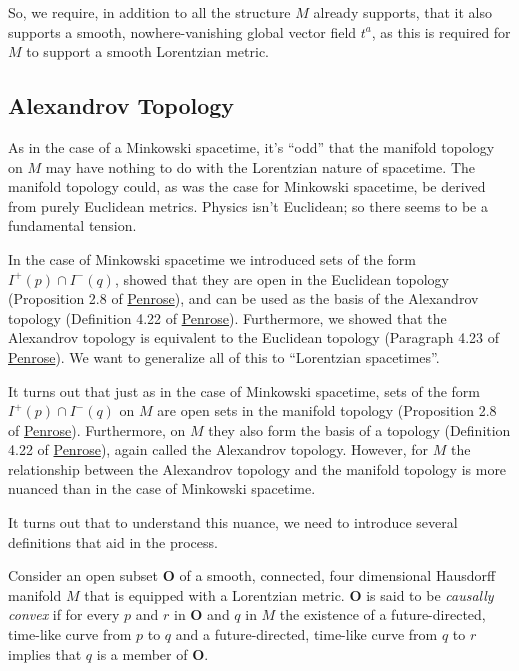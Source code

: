 So, we require, in addition to all the structure $M$ already supports, that it also supports a smooth, nowhere-vanishing global vector field $t^a$, as this is required for $M$ to support a smooth Lorentzian metric.

\subsection{Alexandrov Topology}
As in the case of a Minkowski spacetime, it's ``odd'' that the manifold topology on $M$ may have nothing to do with the Lorentzian nature of spacetime. The manifold topology could, as was the case for Minkowski spacetime, be derived from purely Euclidean metrics. Physics isn't Euclidean; so there seems to be a fundamental tension.

In the case of Minkowski spacetime we introduced sets of the form $I^+(p) \cap I^-(q)$, showed that they are open in the Euclidean topology (Proposition 2.8 of \href{https://doi.org/10.1137/1.9781611970609}{Penrose}), and can be used as the basis of the Alexandrov topology (Definition 4.22 of \href{https://doi.org/10.1137/1.9781611970609}{Penrose}). Furthermore, we showed that the Alexandrov topology is equivalent to the Euclidean topology (Paragraph 4.23 of \href{https://doi.org/10.1137/1.9781611970609}{Penrose}). We want to generalize all of this to ``Lorentzian spacetimes''.

It turns out that just as in the case of Minkowski spacetime, sets of the form $I^+(p) \cap I^-(q)$ on $M$ are open sets in the manifold topology (Proposition 2.8 of \href{https://doi.org/10.1137/1.9781611970609}{Penrose}). Furthermore, on $M$ they also form the basis of a topology (Definition 4.22 of \href{https://doi.org/10.1137/1.9781611970609}{Penrose}), again called the Alexandrov topology. However, for $M$ the relationship between the Alexandrov topology and the manifold topology is more nuanced than in the case of Minkowski spacetime.

It turns out that to understand this nuance, we need to introduce several definitions that aid in the process.

\begin{definition}
    Consider an open subset $\mathbf{O}$ of a smooth, connected, four dimensional Hausdorff manifold $M$ that is equipped with a Lorentzian metric. $\mathbf{O}$ is said to be \textit{causally convex} if for every $p$ and $r$ in $\mathbf{O}$ and $q$ in $M$ the existence of a future-directed, time-like curve from $p$ to $q$ and a future-directed, time-like curve from $q$ to $r$ implies that $q$ is a member of $\mathbf{O}$.
\end{definition}

